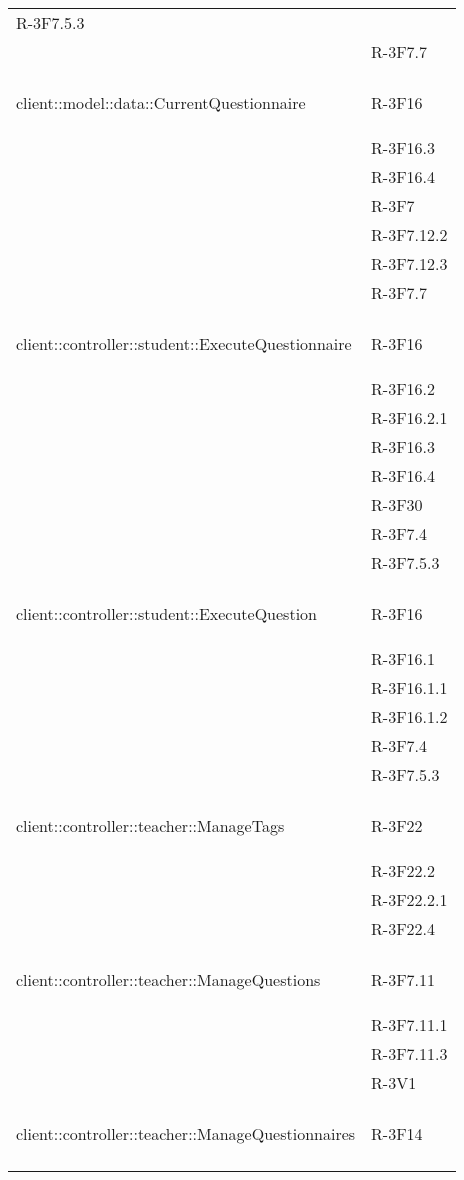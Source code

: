 \begin{longtable}{l p{3cm}}
	R-3F7.5.3 \tabularnewline &
	
	R-3F7.7 \tabularnewline &\tabularnewline
	\hline
	\hypertarget{client::model::data::CurrentQuestionnaire}{client::model::data::CurrentQuestionnaire} & R-3F16 \tabularnewline &
	
	R-3F16.3 \tabularnewline &
	
	R-3F16.4 \tabularnewline &
	
	R-3F7 \tabularnewline &
	
	R-3F7.12.2 \tabularnewline &
	
	R-3F7.12.3 \tabularnewline &
	
	R-3F7.7 \tabularnewline &\tabularnewline
	\hline
	\hypertarget{client::controller::student::ExecuteQuestionnaire}{client::controller::student::ExecuteQuestionnaire} & R-3F16 \tabularnewline &
	
	R-3F16.2 \tabularnewline &
	
	R-3F16.2.1 \tabularnewline &
	
	R-3F16.3 \tabularnewline &
	
	R-3F16.4 \tabularnewline &
	
	R-3F30 \tabularnewline &
	
	R-3F7.4 \tabularnewline &
	
	R-3F7.5.3 \tabularnewline &\tabularnewline
	\hline
	\hypertarget{client::controller::student::ExecuteQuestion}{client::controller::student::ExecuteQuestion} & R-3F16 \tabularnewline &
	
	R-3F16.1 \tabularnewline &
	
	R-3F16.1.1 \tabularnewline &
	
	R-3F16.1.2 \tabularnewline &
	
	R-3F7.4 \tabularnewline &
	
	R-3F7.5.3 \tabularnewline &\tabularnewline
	\hline
	\hypertarget{client::controller::teacher::ManageTags}{client::controller::teacher::ManageTags} & R-3F22 \tabularnewline &
	
	R-3F22.2 \tabularnewline &
	
	R-3F22.2.1 \tabularnewline &
	
	R-3F22.4 \tabularnewline &\tabularnewline
	\hline
	\hypertarget{client::controller::teacher::ManageQuestions}{client::controller::teacher::ManageQuestions} & R-3F7.11 \tabularnewline &
	
	R-3F7.11.1 \tabularnewline &
	
	R-3F7.11.3 \tabularnewline &
	
	R-3V1 \tabularnewline &\tabularnewline
	\hline
	\hypertarget{client::controller::teacher::ManageQuestionnaires}{client::controller::teacher::ManageQuestionnaires} & R-3F14 \tabularnewline &
	

\end{longtable}
